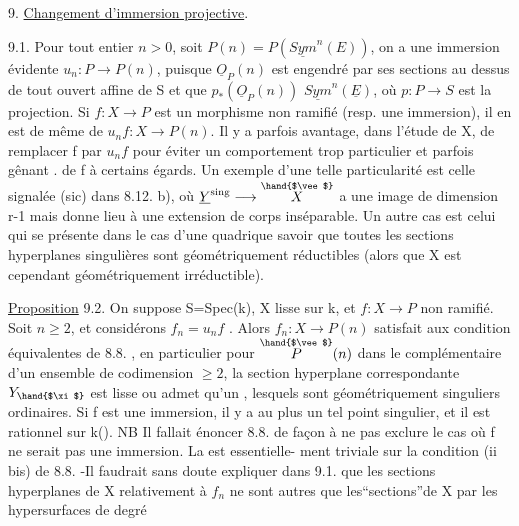 
9. \uline{Changement d'immersion projective}.

9.1. Pour tout entier $n > 0$, soit $P(n) = P(\underline{Sym}^n(E))$, on a une
immersion évidente $u_n\colon P \to P(n)$, puisque $\underline{O}_P(n)$ est engendré par
ses sections au dessus de tout ouvert affine de S et que $p_*(\underline{O}_P(n))$
$\underline{Sym}^n(\underline{E})$, où $p\colon P \to S$ est la projection. Si $f\colon X\to P$ est un morphisme
non ramifié (resp. une immersion), il en est de même de $u_n f\colon X \to P(n)$.
Il y a parfois avantage, dans l'étude de X, de  remplacer f par $u_n f$ 
pour éviter un comportement trop particulier et parfois  gênant .
de f à certains égards. Un exemple d'une telle particularité est celle
 signalée (sic) dans 8.12. b),  où $\underline{Y}^{\mathrm{sing}} \longrightarrow \overset{\hand{$\vee$}}{X}$ a une image de
dimension r-1 mais  donne lieu à une extension
de corps inséparable. Un autre cas est celui qui se présente dans le cas
d'une quadrique  savoir que
toutes les sections hyperplanes singulières sont géométriquement
réductibles (alors que X est cependant géométriquement irréductible).

\uline{Proposition} 9.2. On suppose S=Spec(k), X lisse sur k, et $f\colon X\to P$ non
ramifié. Soit $n \geq 2$, et considérons $f_n = u_n f$ . Alors $f_n : X \to P(n)$
satisfait aux condition équivalentes de 8.8. , en particulier
pour \hand{$\xi \in$} $\overset{\hand{$\vee$}}{P}(n)$ dans le complémentaire d'un ensemble de codimension $\geq 2$,
la section hyperplane correspondante $Y_{\hand{$\xi$}}$ est lisse  ou admet qu'un
, lesquels sont géométriquement singuliers
ordinaires. Si f est une immersion, il y a au
plus un tel point singulier, et il est rationnel sur k(\hand{$\xi$}).
\margin{$\|$} NB Il fallait énoncer 8.8. de façon à  ne pas exclure le
cas où f ne serait pas une immersion. La  est essentielle-%
ment triviale sur la condition (ii bis) de 8.8. -Il faudrait sans doute
expliquer dans 9.1. que les sections hyperplanes de X relativement à
 $f_n$ ne sont autres que les``sections''de X par les hypersurfaces de degré
